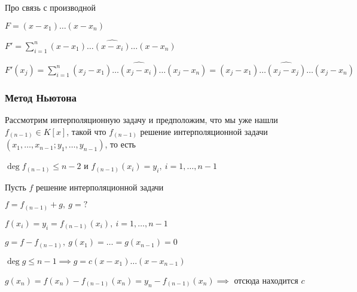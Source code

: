 \begin{notice}
    Про связь с производной

    $F = (x - x_1) \ldots (x - x_n)$

    $F' = \sum\limits_{i = 1}^n (x - x_1) \ldots \widehat{(x - x_i)} \ldots (x - x_n)$

    $F'(x_j) = \sum\limits_{i = 1}^n (x_j - x_1) \ldots \widehat{(x_j - x_i)} \ldots (x_j - x_n) = (x_j - x_1) \ldots \widehat{(x_j - x_j)} \ldots (x_j - x_n)$
\end{notice}

\subsubsection*{Метод Ньютона}

Рассмотрим интерполяционную задачу и предположим, что мы уже нашли $f_{(n - 1)} \in K[x]$, такой что $f_{(n - 1)}$ решение интерполяционной задачи $(x_1, \ldots, x_{n - 1}; y_1, \dots, y_{n - 1})$, то есть

$\deg f_{(n - 1)} \leq n - 2$ и $f_{(n - 1)}(x_i) = y_i,~i = 1, \ldots, n - 1$

Пусть $f$ решение интерполяционной задачи

$f = f_{(n - 1)} + g,~ g = ?$

$f(x_i) = y_i = f_{(n - 1)}(x_i),~ i = 1, \ldots, n - 1$

$g = f - f_{(n - 1)},~ g(x_1) = \ldots = g(x_{n - 1}) = 0$

$\deg g \leq n - 1 \implies g = c (x - x_1) \ldots (x - x_{n - 1})$

$g(x_n) = f(x_n) - f_{(n - 1)}(x_n) = y_n - f_{(n - 1)}(x_n) \implies$ отсюда находится $c$
